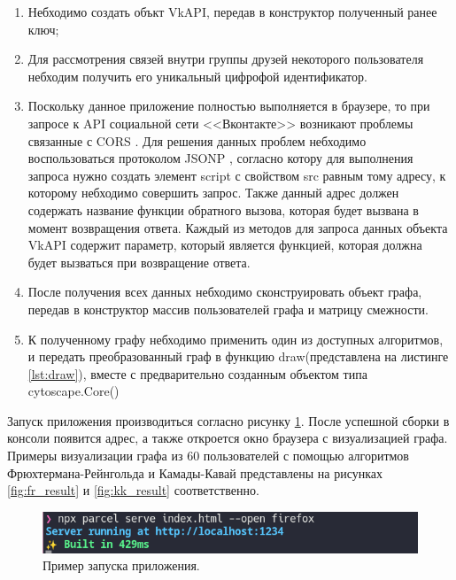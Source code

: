 \documentclass[14pt, russian]{scrartcl}
\begin{document}
\begin{enumerate}
  \item Небходимо создать объкт VkAPI, передав в конструктор полученный ранее ключ;
  \item Для рассмотрения связей внутри группы друзей некоторого пользователя небходим получить его уникальный цифрофой идентификатор.
  \item Поскольку данное приложение полностью выполняется в браузере, то при запросе к API социальной сети <<Вконтакте>> возникают проблемы связанные с CORS \cite{CORS}. Для решения данных проблем небходимо воспользоваться протоколом JSONP \cite{JSONP}, согласно котору для выполнения запроса нужно создать элемент script с свойством src равным тому адресу, к которому небходимо совершить запрос. Также данный адрес должен содержать название функции обратного вызова, которая будет вызвана в момент возвращения ответа. Каждый из методов для запроса данных объекта VkAPI содержит параметр, который является функцией, которая должна будет вызваться при возвращение ответа.
  \item После получения всех данных небходимо сконструировать объект графа, передав в конструктор массив пользователей графа и матрицу смежности.
  \item К полученному графу небходимо применить один из доступных алгоритмов, и передать преобразованный граф в функцию draw(представлена на листинге \ref{lst:draw}), вместе с предварительно созданным объектом типа cytoscape.Core()
\end{enumerate}

Запуск приложения производиться согласно рисунку \ref{fig:run_app}. После успешной сборки в консоли появится адрес, а также откроется окно браузера с визуализацией графа. Примеры визуализации графа из 60 пользователей с помощью алгоритмов Фрюхтермана-Рейнгольда и Камады-Кавай представлены на рисунках \ref{fig:fr_result} и  \ref{fig:kk_result} соответственно. 

\begin{figure}[H]
\centering
  \begin{minipage}[t]{.8\textwidth}
  \centering
\includegraphics[width=.8\textwidth]{./imgs/run_app.png}
  \end{minipage}
\caption{Пример запуска приложения.}
\label{fig:run_app}
\end{figure}
\end{document}
